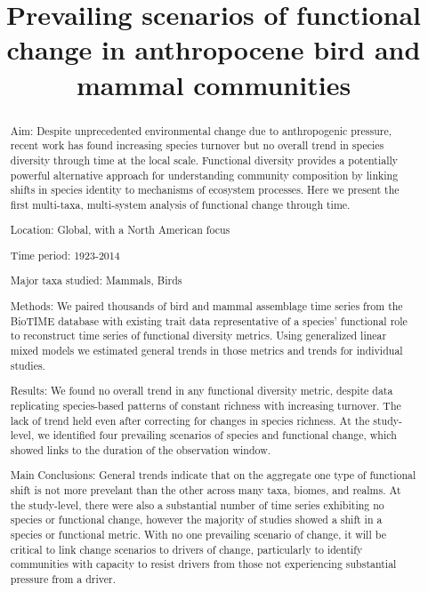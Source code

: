 \documentclass{article}
\title{Prevailing scenarios of functional change in anthropocene bird
and mammal communities}
\author{
  }
\begin{document}
\maketitle


\begin{abstract}
Aim: Despite unprecedented environmental change due to anthropogenic
pressure, recent work has found increasing species turnover but no
overall trend in species diversity through time at the local scale.
Functional diversity provides a potentially powerful alternative
approach for understanding community composition by linking shifts in
species identity to mechanisms of ecosystem processes. Here we present
the first multi-taxa, multi-system analysis of functional change through
time.

Location: Global, with a North American focus

Time period: 1923-2014

Major taxa studied: Mammals, Birds

Methods: We paired thousands of bird and mammal assemblage time series
from the BioTIME database with existing trait data representative of a
species' functional role to reconstruct time series of functional
diversity metrics. Using generalized linear mixed models we estimated
general trends in those metrics and trends for individual studies.

Results: We found no overall trend in any functional diversity metric,
despite data replicating species-based patterns of constant richness
with increasing turnover. The lack of trend held even after correcting
for changes in species richness. At the study-level, we identified four
prevailing scenarios of species and functional change, which showed
links to the duration of the observation window.

Main Conclusions: General trends indicate that on the aggregate one type
of functional shift is not more prevelant than the other across many
taxa, biomes, and realms. At the study-level, there were also a
substantial number of time series exhibiting no species or functional
change, however the majority of studies showed a shift in a species or
functional metric. With no one prevailing scenario of change, it will be
critical to link change scenarios to drivers of change, particularly to
identify communities with capacity to resist drivers from those not
experiencing substantial pressure from a driver.
\end{abstract}

\end{document}
